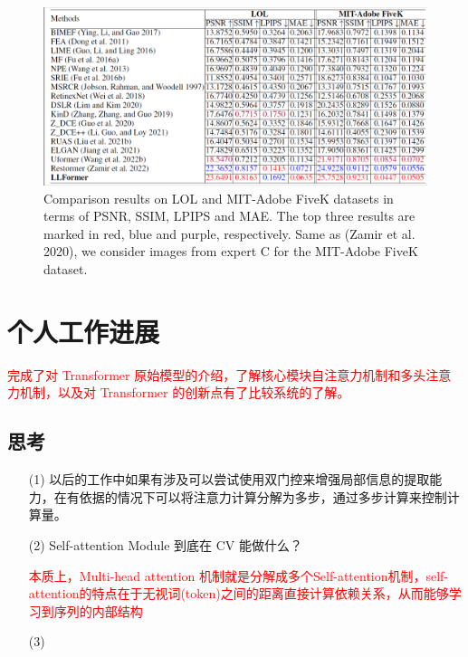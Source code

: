 \documentclass[letterpaper,10pt]{article}
\begin{document}
	\begin{figure}[htbp]
		\centering 
		\includegraphics[width=\columnwidth]{picture/Results_on_LOL_and_MIT-Adobe_FiveK}
		\captionsetup{font=scriptsize}
		\caption{
			\label{fig: result_in_LOL_and_MIT} %
			Comparison results on LOL and MIT-Adobe FiveK datasets in terms of PSNR, SSIM, LPIPS and MAE. The top three results are marked in red, blue and purple, respectively. Same as (Zamir et al. 2020), we consider images from expert C for the MIT-Adobe FiveK dataset.
		}
	\end{figure}
	
	\section{个人工作进展}
	
	\textcolor{red}{完成了对 Transformer 原始模型的介绍，了解核心模块自注意力机制和多头注意力机制，以及对 Transformer 的创新点有了比较系统的了解。}
	
	\subsection{思考}
	
	\begin{itemize}
		\item [(1)] 以后的工作中如果有涉及可以尝试使用双门控来增强局部信息的提取能力，在有依据的情况下可以将注意力计算分解为多步，通过多步计算来控制计算量。
		
		\item [(2)] Self-attention Module 到底在 CV 能做什么？
		
		\textcolor{red}{本质上，Multi-head attention 机制就是分解成多个Self-attention机制，self-attention的特点在于无视词(token)之间的距离直接计算依赖关系，从而能够学习到序列的内部结构}
		
		\item [(3)] \textcolor{red}{}
		
	\end{itemize}
\end{document}

